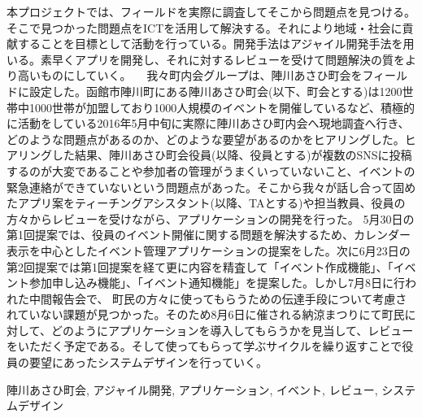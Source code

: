 \begin{jabstract}
\quad 本プロジェクトでは、フィールドを実際に調査してそこから問題点を見つける。そこで見つかった問題点をICTを活用して解決する。それにより地域・社会に貢献することを目標として活動を行っている。開発手法はアジャイル開発手法を用いる。素早くアプリを開発し、それに対するレビューを受けて問題解決の質をより高いものにしていく。
　我々町内会グループは、陣川あさひ町会をフィールドに設定した。函館市陣川町にある陣川あさひ町会(以下、町会とする)は1200世帯中1000世帯が加盟しており1000人規模のイベントを開催しているなど、積極的に活動をしている2016年5月中旬に実際に陣川あさひ町内会へ現地調査へ行き、どのような問題点があるのか、どのような要望があるのかをヒアリングした。ヒアリングした結果、陣川あさひ町会役員(以降、役員とする)が複数のSNSに投稿するのが大変であることや参加者の管理がうまくいっていないこと、イベントの緊急連絡ができていないという問題点があった。そこから我々が話し合って固めたアプリ案をティーチングアシスタント(以降、TAとする)や担当教員、役員の方々からレビューを受けながら、アプリケーションの開発を行った。
5月30日の第1回提案では、役員のイベント開催に関する問題を解決するため、カレンダー表示を中心としたイベント管理アプリケーションの提案をした。次に6月23日の第2回提案では第1回提案を経て更に内容を精査して「イベント作成機能」、「イベント参加申し込み機能」、「イベント通知機能」を提案した。しかし7月8日に行われた中間報告会で、
町民の方々に使ってもらうための伝達手段について考慮されていない課題が見つかった。そのため8月6日に催される納涼まつりにて町民に対して、どのようにアプリケーションを導入してもらうかを見当して、レビューをいただく予定である。そして使ってもらって学ぶサイクルを繰り返すことで役員の要望にあったシステムデザインを行っていく。

\begin{jkeyword}
陣川あさひ町会, アジャイル開発, アプリケーション, イベント, レビュー, システムデザイン
\end{jkeyword}
\end{jabstract}
​
